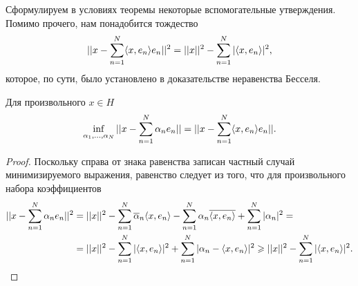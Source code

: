 \documentclass[main]{subfiles}
\begin{document}
Сформулируем в условиях теоремы некоторые вспомогательные утверждения.
Помимо прочего, нам понадобится тождество
\[
  ||x - \sum_{n = 1}^N \langle x, e_n \rangle e_n||^2 =
  ||x||^2 - \sum_{n=1}^N |\langle x, e_n \rangle|^2,
\]
которое, по сути, было установлено в доказательстве
неравенства Бесселя.

\begin{lemma}
  Для произвольного \( x \in H \)
  \[
    \inf_{\alpha_1, \dots, \alpha_N} ||x - \sum_{n = 1}^N \alpha_n e_n|| =
    ||x - \sum_{n = 1}^N \langle x, e_n \rangle e_n||.
  \]
\end{lemma}
\begin{proof}
  Поскольку справа от знака равенства записан
  частный случай минимизируемого выражения,
  равенство следует из того, что
  для произвольного набора коэффициентов
  \begin{align}
    ||x - \sum_{n = 1}^N \alpha_n e_n||^2 &=
    ||x||^2 - \sum_{n = 1}^N \overline{\alpha}_n \langle x, e_n \rangle -
    \sum_{n = 1}^N \alpha_n \overline{\langle x, e_n \rangle} +
    \sum_{n = 1}^N |\alpha_n|^2 = \\
    &=
    ||x||^2 - \sum_{n = 1}^N |\langle x, e_n \rangle|^2 +
    \sum_{n = 1}^N |\alpha_n - \langle x, e_n \rangle|^2 \geqslant
    ||x||^2 - \sum_{n = 1}^N |\langle x, e_n \rangle|^2. \qedhere
  \end{align}
\end{proof}
\end{document}
